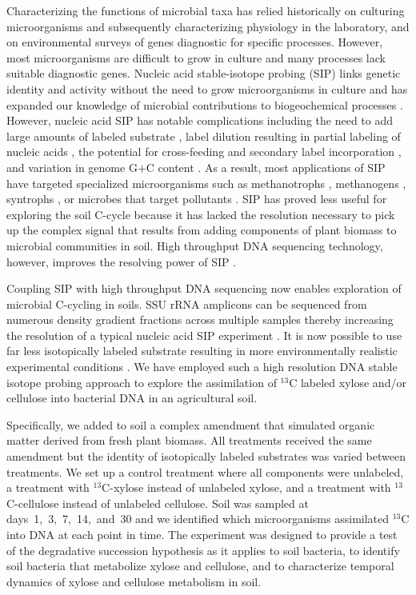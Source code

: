 Characterizing the functions of microbial taxa has relied historically on
culturing microorganisms and subsequently characterizing physiology in the
laboratory, and on environmental surveys of genes diagnostic for specific
processes. However, most microorganisms are difficult to grow in culture
\citep{Janssen2006} and many processes lack suitable diagnostic genes. Nucleic
acid stable-isotope probing (SIP) links genetic identity and activity without
the need to grow microorganisms in culture and has expanded our knowledge of
microbial contributions to biogeochemical processes \citep{Chen_Murrell_2010}.
However, nucleic acid SIP has notable complications including the need to add
large amounts of labeled substrate \citep{radajewski2000stable}, label dilution
resulting in partial labeling of nucleic acids
\citep{radajewski2000stable,Manefield_2002,McDonald_2005}, the potential for
cross-feeding and secondary label incorporation
\citep{Morris_2002,Hutchens2004,14686943,DeRito2005,McDonald_2005,Ziegler_2005},
and variation in genome G$+$C content
\citep{Buckley_2007,9780408708036,Holben1995,Nusslein1999}. As a result, most
applications of SIP have targeted specialized microorganisms such as
methanotrophs \citep{radajewski2000stable}, methanogens \citep{lu2005},
syntrophs \citep{lueders2004}, or microbes that target pollutants
\citep{derito2005}. SIP has proved less useful for exploring the soil C-cycle
because it has lacked the resolution necessary to pick up the complex signal
that results from adding components of plant biomass to microbial
communities in soil. High throughput DNA sequencing technology, however,
improves the resolving power of SIP \citep{Aoyagi2015}. 

Coupling SIP with high throughput DNA sequencing now enables exploration of
microbial C-cycling in soils. SSU rRNA amplicons can be sequenced
from numerous density gradient fractions across multiple samples thereby
increasing the resolution of a typical nucleic acid SIP experiment
\citep{Verastegui_2014}. It is now possible to use far less isotopically
labeled substrate resulting in more environmentally realistic experimental
conditions \citep{Aoyagi2015}. We have employed such a high resolution DNA
stable isotope probing approach to explore the assimilation of $^{13}$C labeled
xylose and/or cellulose into bacterial DNA in an agricultural soil. 

Specifically, we added to soil a complex amendment that simulated organic
matter derived from fresh plant biomass. All treatments received the same
amendment but the identity of isotopically labeled substrates was varied
between treatments. We set up a control treatment where all components were
unlabeled, a treatment with $^{13}$C-xylose instead of unlabeled xylose, and
a treatment with $^{13}$C-cellulose instead of unlabeled cellulose. Soil was
sampled at days~1,~3,~7,~14,~and~30 and we identified which microorganisms 
assimilated $^{13}$C into DNA at each point in time. The experiment was
designed to provide a test of the degradative succession hypothesis as it
applies to soil bacteria, to identify soil bacteria that
metabolize xylose and cellulose, and to characterize temporal dynamics of
xylose and cellulose metabolism in soil. 

